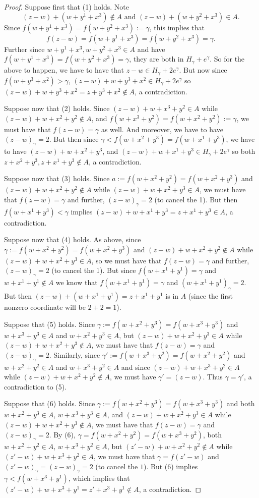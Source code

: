 \documentclass[12pt,oneside,british,a4wide]{amsart}
\numberwithin{equation}{section}
\theoremstyle{definition}
\begin{document}
\begin{proof}
Suppose first that (1) holds.  Note
$$
(z-w)+(w+y^1+x^3)\notin A\text{ and }(z-w)+(w+y^2+x^3)\in A.
$$
Since $f(w+y^1+x^3)=f(w+y^2+x^3):=\gamma$, this implies that 
$$
f(z-w)=f(w+y^1+x^3)=f(w+y^2+x^3)=\gamma.
$$ 
Further since $w+y^1+x^3,w+y^2+x^3\in A$ and have $f(w+y^1+x^3)=f(w+y^2+x^3)=\gamma$, they are both in $H_\gamma+e^\gamma$.  So for the above to happen, we have to have that $z-w\in H_\gamma+2e^\gamma$.    But now since $f(w+y^3+x^2)>\gamma$, $(z-w)+w+y^3+x^2\in H_\gamma+2e^\gamma$ so $(z-w)+w+y^3+x^2=z+y^3+x^2\notin A$, a contradiction.

Suppose now that (2) holds.  Since $(z-w)+w+x^3+y^2\in A$ while $(z-w)+w+ x^2+y^2\notin A$, and $f(w+x^3+y^2)=f(w+x^2+y^2):=\gamma$, we must have that $f(z-w)=\gamma$ as well.  And moreover, we have to have $(z-w)_\gamma=2$.  But then since $\gamma<f(w+x^2+y^3)=f(w+x^1+y^3)$, we have to have $(z-w)+w+x^2+y^3$, and $(z-w)+w+x^1+y^3\in H_\gamma+2e^\gamma$ so both $z+x^2+y^3, z+x^1+y^3\notin A$, a contradiction.

Suppose now that (3) holds.  Since $a:=f(w+x^2+y^2)=f(w+x^2+y^3)$ and $(z-w)+w+x^2+y^2\notin A$ while $(z-w)+w+x^2+y^3 \in A$, we must have that $f(z-w)=\gamma$ and further, $(z-w)_\gamma=2$ (to cancel the 1).  But then $f(w+x^1+y^3)<\gamma$ implies $(z-w)+w+x^1+y^3=z+x^1+y^3 \in A$, a contradiction.

Suppose now that (4) holds.  As above, since $\gamma:=f(w+x^2+y^2)=f(w+x^2+y^3)$ and $(z-w)+w+x^2+y^2\notin A$ while $(z-w)+w+x^2+y^3 \in A$, so we must have that $f(z-w)=\gamma$ and further, $(z-w)_\gamma=2$ (to cancel the 1).  But since $f(w+x^1+y^1)=\gamma$ and $w+x^1+y^1\notin A$ we know that $f(w+x^1+y^1)=\gamma$ and $(w+x^1+y^1)_\gamma=2$.  But then $(z-w)+(w+x^1+y^1)=z+x^1+y^1$ is in $A$ (since the first nonzero coordinate will be $2+2=1$).

Suppose that (5) holds.  Since $\gamma:=f(w+x^2+y^3)=f(w+x^3+y^3)$ and $w+x^3+y^3\in A$ and $w+x^2+y^3\in A$, but $(z-w)+w+x^2+y^3\in A$ while $(z-w)+w+x^2+y^3\notin A$, we must have that $f(z-w)=\gamma$ and $(z-w)_\gamma=2$.  Similarly, since $\gamma':=f(w+x^3+y^2)=f(w+x^2+y^2)$ and $w+x^2+y^2\in A$ and $w+x^3+y^2\in A$ and since $(z-w)+w+x^3+y^2\in A$ while $(z-w)+w+x^2+y^2\notin A$, we must have $\gamma'=(z-w)$.  Thus $\gamma=\gamma'$, a contradiction to (5).

Suppose that (6) holds.  Since $\gamma:=f(w+x^2+y^3)=f(w+x^3+y^3)$ and both $w+x^2+y^3\in A$, $w+x^3+y^3\in A$, and $(z-w)+w+x^2+y^3\in A$ while $(z-w)+w+x^2+y^3\notin A$, we must have that $f(z-w)=\gamma$ and $(z-w)_\gamma=2$.  By (6), $\gamma=f(w+x^2+y^2)=f(w+x^3+y^2)$, both $w+x^2+y^2\in A$, $w+x^3+y^2\in A$, but $(z'-w)+w+x^2+y^2\notin A$ while $(z'-w)+w+x^3+y^2\in A$, we must have that $\gamma=f(z'-w)$ and $(z'-w)_\gamma=(z-w)_\gamma=2$ (to cancel the $1$).  But (6) implies $\gamma<f(w+x^3+y^1)$, which implies that $(z'-w)+w+x^3+y^1=z'+x^3+y^1\notin A$, a contradiction.
\end{proof}
\end{document}
